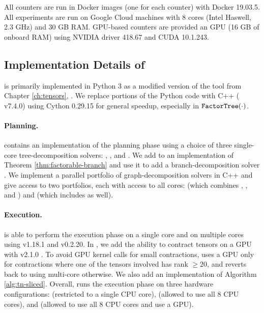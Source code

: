 All counters are run in Docker images (one for each counter) with Docker 19.03.5. All experiments are run on Google Cloud  machines with 8 cores (Intel Haswell, 2.3 GHz) and 30 GB RAM. GPU-based counters are provided an  GPU (16 GB of onboard RAM) using NVIDIA driver 418.67 and CUDA 10.1.243.

\subsection{Implementation Details of }
\label{sec:experiments:impl}
 is primarily implemented in Python 3 as a modified version of the tool from Chapter \ref{ch:tensors}, . We replace portions of the Python code with C++ ( v7.4.0) using Cython 0.29.15 for general speedup, especially in $\texttt{\upshape FactorTree}(\cdot)$.

\paragraph{Planning.} 
 contains an implementation of the planning phase using a choice of three single-core tree-decomposition solvers:  \cite{Tamaki17},  \cite{HS18}, and  \cite{AMW17}. We add to  an implementation of Theorem \ref{thm:factorable-branch} and use it to add a branch-decomposition solver  \cite{hicks02}.
We implement a parallel portfolio of graph-decomposition solvers in C++ and give  access to two portfolios, each with access to all cores:  (which combines ,  , and ) and  (which includes  as well).

\paragraph{Execution.} 
 is able to perform the execution phase on a single core and on multiple cores using  v1.18.1 and  v0.2.20. In , we add the ability to contract tensors on a GPU with  v2.1.0 \cite{ABCCDDDGII16}. To avoid GPU kernel calls for small contractions,  uses a GPU only for contractions where one of the tensors involved has rank $\geq 20$, and reverts back to using multi-core  otherwise. We also add an implementation of Algorithm \ref{alg:tn-sliced}.
Overall,  runs the execution phase on three hardware configurations:  (restricted to a single CPU core),  (allowed to use all 8 CPU cores), and  (allowed to use all 8 CPU cores and use a GPU).


